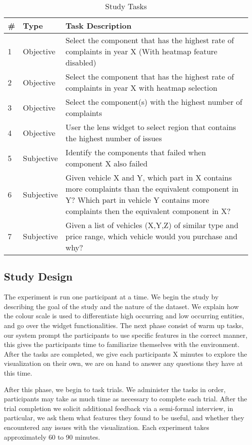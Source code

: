 \begin{table}[h]
\centering
\begin{tabular}{|l|l| p{4.0in}|}
\hline
 \# & Type & Task Description \\
\hline
\hline 
1 &  Objective & Select the component that has the highest rate of complaints in
year X (With heatmap feature disabled) \\
\hline
2 &  Objective & Select the component that has the highest rate of complaints in
year X with heatmap selection \\
\hline
3 &  Objective & Select the component(s) with the highest number of complaints\\
\hline 
4 &  Objective & User the lens widget to select region that contains the highest
number of issues\\
\hline
5 & Subjective & Identify the components that failed when component X also
failed \\
\hline
6 & Subjective & Given vehicle X and Y, which part in X contains more complaints
than the equivalent component in Y? Which part in vehicle Y contains more
complaints then the equivalent component in X? \\
\hline
7 & Subjective & Given a list of vehicles (X,Y,Z) of similar type and price
range, which vehicle would you purchase and why? \\
\hline
\end{tabular}\caption{Study Tasks}\label{table:StudyTask}
\end{table}
 
\subsection{Study Design}
The experiment is run one participant at a time. We begin the study by
describing the goal of the study and the nature of the dataset. We explain how
the colour scale is used to differentiate high occurring and low occurring
entities, and go over the widget functionalities. The next phase consist of warm
up tasks, our system prompt the participants to use specific features in the
correct manner, this gives the participants time to familiarize themselves with
the environment. After the tasks are completed, we give each participants X
minutes to explore the visualization on their own, we are on hand to answer any
questions they have at this time.

After this phase, we begin to task trials. We administer the tasks in order,
participants may take as much time as necessary to complete each trial. After
the trial completion we solicit additional feedback via a semi-formal interview,
in particular, we ask them what features they found to be useful, and whether
they encountered any issues with the visualization. Each experiment takes
approximately 60 to 90 minutes.

